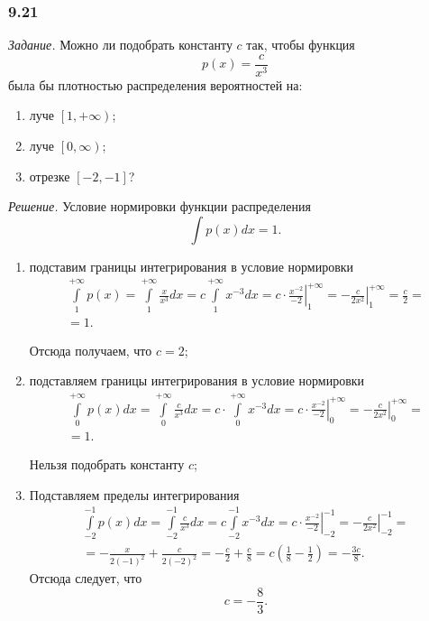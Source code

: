 \subsubsection*{9.21}

\textit{Задание.} Можно ли подобрать константу $c$ так, чтобы функция
$$p \left( x \right) =
\frac{c}{x^3}$$
была бы плотностью распределения вероятностей на:
\begin{enumerate}[label=\alph*)]
\item луче $ \left[ 1, + \infty \right) $;
\item луче $ \left[ 0, \infty \right) $;
\item отрезке $ \left[ -2, -1 \right] $?
\end{enumerate}

\textit{Решение.} Условие нормировки функции распределения
$$ \int p \left( x \right) dx = 1.$$

\begin{enumerate}[label=\alph*)]
\item подставим границы интегрирования в условие нормировки
\begin{equation*}
\begin{split}
\int \limits_1^{+ \infty } p \left( x \right) =
\int \limits_1^{+ \infty } \frac{x}{x^3} dx =
c \int \limits_1^{+ \infty } x^{-3}dx =
\left. c \cdot \frac{x^{-2}}{-2} \right|_1^{+ \infty } =
\left. - \frac{c}{2x^2} \right|_1^{+ \infty } =
\frac{c}{2} = \\
= 1.
\end{split}
\end{equation*}

Отсюда получаем, что $c = 2$;
\item подставляем границы интегрирования в условие нормировки
\begin{equation*}
\begin{split}
\int \limits_0^{+ \infty } p \left( x \right) dx =
\int \limits_0^{+ \infty } \frac{c}{x^3} dx =
c \cdot \int \limits_0^{+ \infty } x^{-3} dx =
\left. c \cdot \frac{x^{-2}}{-2} \right|_0^{+ \infty } =
\left. - \frac{c}{2x^2} \right|_0^{+ \infty } = \\
= 1.
\end{split}
\end{equation*}

Нельзя подобрать константу $c$;
\item Подставляем пределы интегрирования
\begin{equation*}
\begin{split}
\int \limits_{-2}^{-1} p \left( x \right) dx =
\int \limits_{-2}^{-1} \frac{c}{x^3} dx =
c \int \limits_{-2}^{-1} x^{-3} dx =
\left. c \cdot \frac{x^{-2}}{-2} \right|_{-2}^{-1} =
\left. - \frac{c}{2x^2} \right|_{-2}^{-1} = \\
= - \frac{x}{2 \left( -1 \right)^2} + \frac{c}{2 \left( -2 \right)^2} =
- \frac{c}{2} + \frac{c}{8} =
c \left( \frac{1}{8} - \frac{1}{2} \right) =
- \frac{3c}{8}.
\end{split}
\end{equation*}
Отсюда следует, что
$$c = - \frac{8}{3}.$$
\end{enumerate}

